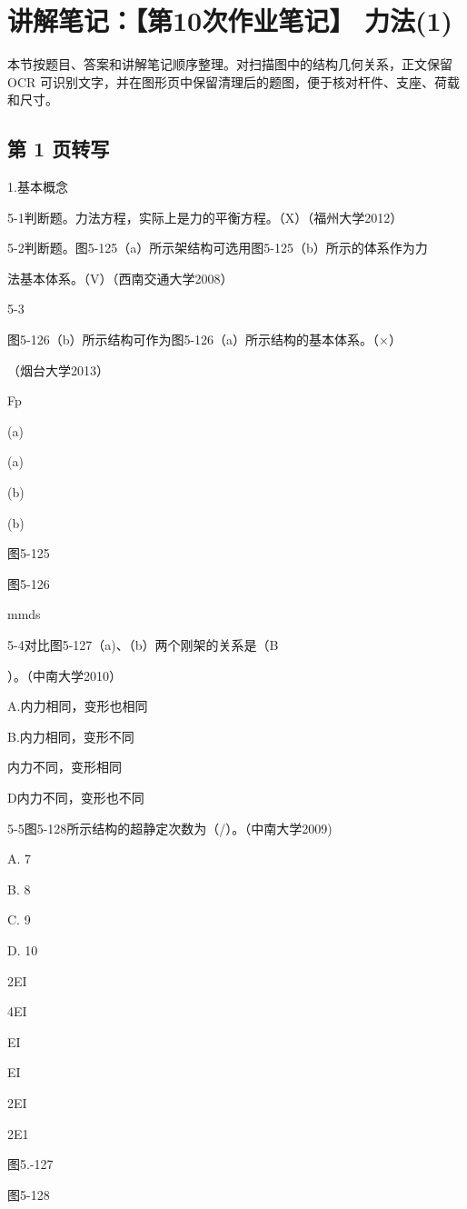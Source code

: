\section{讲解笔记：【第10次作业笔记】 力法(1)}
\begin{analysisbox}
本节按题目、答案和讲解笔记顺序整理。对扫描图中的结构几何关系，正文保留 OCR 可识别文字，并在图形页中保留清理后的题图，便于核对杆件、支座、荷载和尺寸。
\end{analysisbox}
\subsection*{第 1 页转写}
1.基本概念

5-1判断题。力法方程，实际上是力的平衡方程。（X）（福州大学2012）

5-2判断题。图5-125（a）所示架结构可选用图5-125（b）所示的体系作为力

法基本体系。（V）（西南交通大学2008）

5-3

图5-126（b）所示结构可作为图5-126（a）所示结构的基本体系。（$\times$）

（烟台大学2013）

Fp

(a)

(a)

(b)

(b)

图5-125

图5-126

mmds

5-4对比图5-127（a)、（b）两个刚架的关系是（B

）。（中南大学2010）

A.内力相同，变形也相同

B.内力相同，变形不同

内力不同，变形相同

D内力不同，变形也不同

5-5图5-128所示结构的超静定次数为（/）。（中南大学2009)

A. 7

B. 8

C. 9

D. 10

2EI

4EI

EI

EI

2EI

2E1

图5.-127

图5-128

